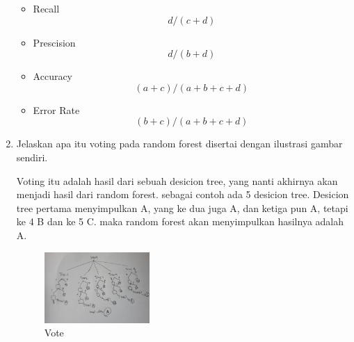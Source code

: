 \begin{enumerate}
\begin{itemize}
                \item Recall
                \begin{equation}
                    d/(c+d)
                \end{equation}
                \item Prescision
                \begin{equation}
                    d/(b+d)
                \end{equation}
                \item Accuracy
                \begin{equation}
                    (a+c)/(a+b+c+d)
                \end{equation}
                \item Error Rate
                \begin{equation}
                    (b+c)/(a+b+c+d)
                \end{equation}
            \end{itemize}
        \item Jelaskan apa itu voting pada random forest disertai dengan ilustrasi gambar sendiri. \par
        Voting itu adalah hasil dari sebuah desicion tree, yang nanti akhirnya akan menjadi hasil dari random forest. sebagai contoh ada 5 desicion tree. Desicion tree pertama menyimpulkan A, yang ke dua juga A, dan ketiga pun A, tetapi ke 4 B dan ke 5 C. maka random forest akan menyimpulkan hasilnya adalah A.
        \begin{figure}[H]
            \includegraphics[width=4cm]{figures/1174040/chapter3/vote.jpeg}
            \centering
            \caption{Vote}
        \end{figure}
    \end{enumerate}
